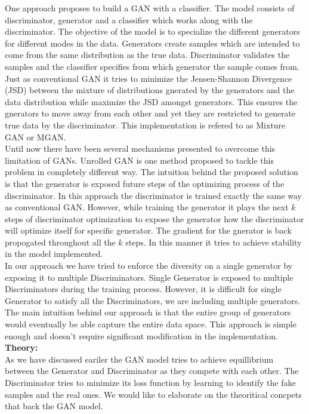 \documentclass[12pt]{article}
\begin{document}
One approach proposes to build a GAN with a classifier. The model consists of discriminator, generator and a classifier which works along with the discriminator. The objective of the model is to specialize the different generators for different modes in the data. Generators create samples which are intended to come from the same distribution as the true data. Discriminator validates the samples and the classifier specifies from which generator the sample comes from. Just as conventional GAN it tries to minimize the Jensen-Shannon Divergence (JSD) between the mixture of distributions gnerated by the generators and the data distribution while maximize the JSD amongst generators. This ensures the gnerators to move away from each other and yet they are restricted to generate true data by the discriminator. This implementation is refered to as Mixture GAN or MGAN.\\

Until now there have been several mechanisms presented to overcome this limitation of GANs. Unrolled GAN is one method proposed to tackle this problem in completely different way. The intuition behind the proposed solution is that the generator is exposed future steps of the optimizing process of the discriminator. In this approach the discriminator is trained exactly the same way as conventional GAN. However, while training the generator it plays the next $k$ steps of discriminator optimization to expose the generator how the discriminator will optimize itself for specific generator. The gradient for the gnerator is back propogated throughout all the $k$ steps. In this manner it tries to achieve stability in the model implemented.\\

In our approach we have tried to enforce the diversity on a single generator by exposing it to multiple Discriminators. Single Generator is exposed to multiple Discriminators during the training process. However, it is difficult for single Generator to satisfy all the Discriminators, we are including multiple generators. The main intuition behind our approach is that the entire group of generators would eventually be able capture the entire data space. This approach is simple enough and doesn't require significant modification in the implementation.\\

\noindent \textbf{Theory:}\\

As we have discussed eariler the GAN model tries to achieve equillibrium between the Generator and Discriminator as they compete with each other. The Discriminator tries to minimize its loss function by learning to identify the fake samples and the real ones. We would like to elaborate on the theoritical concpets that back the GAN model.\\
\end{document}
